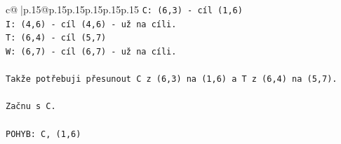 \documentclass{article}
\begin{document}
{\begin{supertabular}{c@{$\;$}|p{.15\linewidth}@{}p{.15\linewidth}p{.15\linewidth}p{.15\linewidth}p{.15\linewidth}p{.15\linewidth}}
{{{\texttt{C: (6,3) {-} cíl (1,6)} \\
\texttt{I: (4,6) {-} cíl (4,6) {-} už na cíli.} \\
\texttt{T: (6,4) {-} cíl (5,7)} \\
\texttt{W: (6,7) {-} cíl (6,7) {-} už na cíli.} \\
\\ 
\texttt{Takže potřebuji přesunout C z (6,3) na (1,6) a T z (6,4) na (5,7).} \\
\\ 
\texttt{Začnu s C.} \\
\\ 
\texttt{POHYB: C, (1,6)} \\
            }
        }
    }
     \\ \\


\end{supertabular}}
\end{document}
